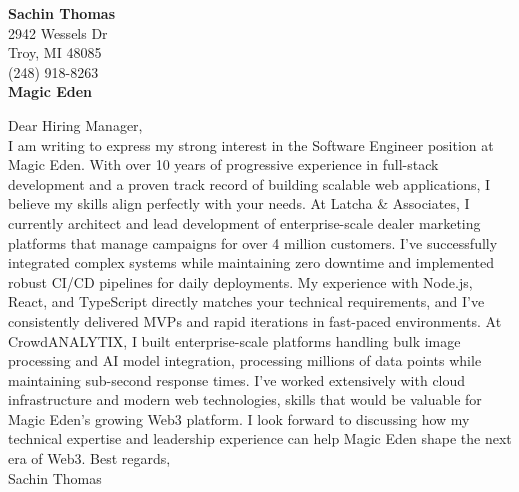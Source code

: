 
\noindent \textbf{Sachin Thomas} \\
2942 Wessels Dr \\
Troy, MI 48085 \\
(248) 918-8263 \\
\newline
\noindent \textbf{Magic Eden}
\newline

\noindent Dear Hiring Manager, \\

\noindent I am writing to express my strong interest in the Software Engineer position at Magic Eden. With over 10 years of progressive experience in full-stack development and a proven track record of building scalable web applications, I believe my skills align perfectly with your needs. 
\newline\newline
\noindent At Latcha \& Associates, I currently architect and lead development of enterprise-scale dealer marketing platforms that manage campaigns for over 4 million customers. I've successfully integrated complex systems while maintaining zero downtime and implemented robust CI/CD pipelines for daily deployments. My experience with Node.js, React, and TypeScript directly matches your technical requirements, and I've consistently delivered MVPs and rapid iterations in fast-paced environments.
\newline\newline
\noindent At CrowdANALYTIX, I built enterprise-scale platforms handling bulk image processing and AI model integration, processing millions of data points while maintaining sub-second response times. I've worked extensively with cloud infrastructure and modern web technologies, skills that would be valuable for Magic Eden's growing Web3 platform.
\newline\newline
I look forward to discussing how my technical expertise and leadership experience can help Magic Eden shape the next era of Web3.
\newline\newline
\noindent Best regards,\\
\noindent Sachin Thomas